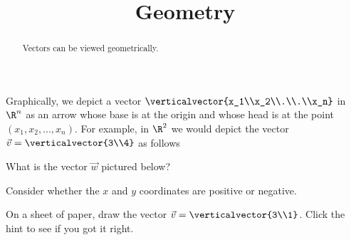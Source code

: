 \documentclass{ximera}
\title{Geometry}
\begin{document}
\begin{abstract}
  Vectors can be viewed geometrically.
\end{abstract}

Graphically, we depict a vector $\verticalvector{x_1\\x_2\\.\\.\\x_n}$
in $\R^n$ as an arrow whose base is at the origin and whose head is at
the point $(x_1,x_2,...,x_n)$.  For example, in $\R^2$ we would depict
the vector $\vec{v} = \verticalvector{3\\4}$ as follows


\begin{question}
  What is the vector $\vec{w}$ pictured below?

  \begin{solution}
    \begin{hint}
      Consider whether the $x$ and $y$ coordinates are positive or negative.
    \end{hint}
    \begin{multiple-choice}
    \end{multiple-choice}
  \end{solution}
\end{question}
  	 
\begin{question}
  \begin{hint}
  \end{hint}
  On a sheet of paper, draw the vector $\vec{v} = \verticalvector{3\\1}$. Click the hint to see if you got it right.
  
\end{question}
  	 
\end{document}
